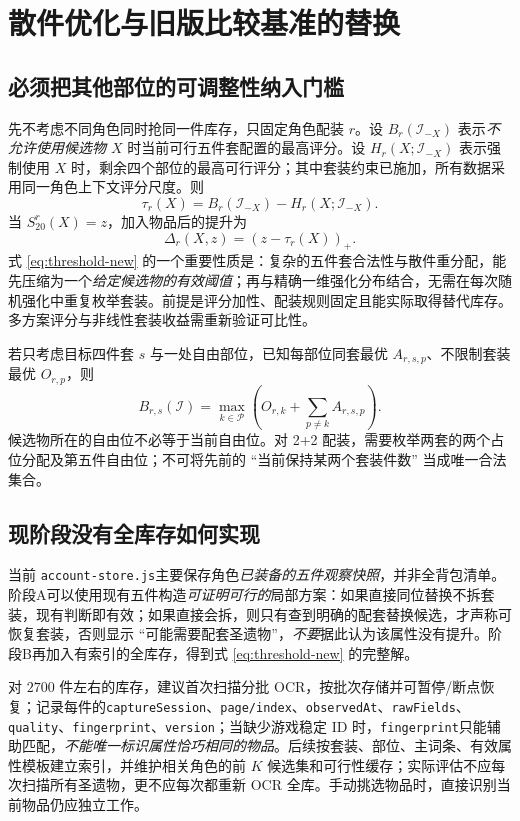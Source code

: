 \documentclass[11pt,a4paper]{ctexart}
\newcommand{\pos}[1]{\left(#1\right)_+}
\begin{document}
\section{散件优化与旧版比较基准的替换}
\subsection{必须把其他部位的可调整性纳入门槛}
先不考虑不同角色同时抢同一件库存，只固定角色配装 $r$。设 $B_r(\mathcal I_{-X})$ 表示\emph{不允许使用候选物 $X$} 时当前可行五件套配置的最高评分。设 $H_r(X;\mathcal I_{-X})$ 表示强制使用 $X$ 时，剩余四个部位的最高可行评分；其中套装约束已施加，所有数据采用同一角色上下文评分尺度。则
\begin{equation}\label{eq:threshold-new}
\boxed{\tau_r(X)=B_r(\mathcal I_{-X})-H_r(X;\mathcal I_{-X}).}
\end{equation}
当 $S_{20}^r(X)=z$，加入物品后的提升为
\begin{equation}\label{eq:uplift-new}
\boxed{\Delta_r(X,z)=\pos{z-\tau_r(X)}.}
\end{equation}
式 \eqref{eq:threshold-new} 的一个重要性质是：复杂的五件套合法性与散件重分配，能先压缩为一个\emph{给定候选物的有效阈值}；再与精确一维强化分布结合，无需在每次随机强化中重复枚举套装。前提是评分加性、配装规则固定且能实际取得替代库存。多方案评分与非线性套装收益需重新验证可比性。

若只考虑目标四件套 $s$ 与一处自由部位，已知每部位同套最优 $A_{r,s,p}$、不限制套装最优 $O_{r,p}$，则
\[
B_{r,s}(\mathcal I)=\max_{k\in\mathcal P}
\left(O_{r,k}+\sum_{p\neq k}A_{r,s,p}\right).
\]
候选物所在的自由位不必等于当前自由位。对 2+2 配装，需要枚举两套的两个占位分配及第五件自由位；不可将先前的 ``当前保持某两个套装件数'' 当成唯一合法集合。

\subsection{现阶段没有全库存如何实现}
当前 \texttt{account-store.js}主要保存角色\emph{已装备的五件观察快照}，并非全背包清单。阶段A可以使用现有五件构造\emph{可证明可行的}局部方案：如果直接同位替换不拆套装，现有判断即有效；如果直接会拆，则只有查到明确的配套替换候选，才声称可恢复套装，否则显示 ``可能需要配套圣遗物''，\emph{不要}据此认为该属性没有提升。阶段B再加入有索引的全库存，得到式 \eqref{eq:threshold-new} 的完整解。

对 $2700$ 件左右的库存，建议首次扫描分批 OCR，按批次存储并可暂停/断点恢复；记录每件的\texttt{captureSession}、\texttt{page/index}、\texttt{observedAt}、\texttt{rawFields}、\texttt{quality}、\texttt{fingerprint}、\texttt{version}；当缺少游戏稳定 ID 时，\texttt{fingerprint}只能辅助匹配，\emph{不能唯一标识属性恰巧相同的物品}。后续按套装、部位、主词条、有效属性模板建立索引，并维护相关角色的前 $K$ 候选集和可行性缓存；实际评估不应每次扫描所有圣遗物，更不应每次都重新 OCR 全库。手动挑选物品时，直接识别当前物品仍应独立工作。
\end{document}
